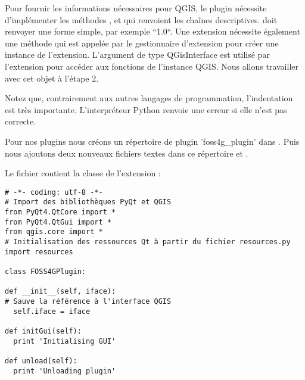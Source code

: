 
Pour fournir les informations nécessaires pour QGIS, le plugin nécessite
d'implémenter les méthodes ,  et
 qui renvoient les chaînes descriptives.
 doit renvoyer une forme simple, par exemple
``1.0``. Une extension nécessite également une méthode
 qui est appelée par le gestionnaire d'extension
 pour créer une instance de l'extension. L'argument de type QGisInterface est
utilisé par l'extension pour accéder aux fonctions de l'instance QGIS. Nous allons
travailler avec cet objet à l'étape 2.


Notez que, contrairement aux autres langages de programmation, l'indentation est
très importante. L'interpréteur Python renvoie une erreur si elle n'est pas
correcte.


Pour nos plugins nous  créons un répertoire de plugin 'foss4g\_plugin' dans
. Puis nous ajoutons deux nouveaux
fichiers textes dans ce répertoire  et
.

Le fichier  contient la classe de l'extension :

\begin{verbatim}
# -*- coding: utf-8 -*-
# Import des bibliothèques PyQt et QGIS
from PyQt4.QtCore import *
from PyQt4.QtGui import *
from qgis.core import *
# Initialisation des ressources Qt à partir du fichier resources.py
import resources

class FOSS4GPlugin:

def __init__(self, iface):
# Sauve la référence à l'interface QGIS
  self.iface = iface

def initGui(self):
  print 'Initialising GUI'

def unload(self):
  print 'Unloading plugin'
\end{verbatim}

